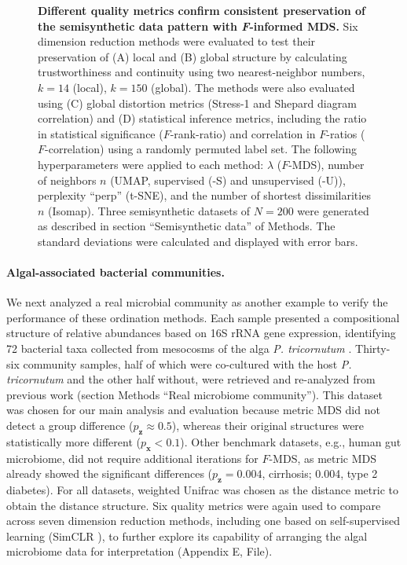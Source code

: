 \documentclass[10pt,letterpaper]{article}
\newcommand{\1}{{\rm 1}\kern-0.24em{\rm I}}
\begin{document}
\begin{figure}[h!]
    \centering
    \caption{\textbf{Different quality metrics confirm consistent preservation of the semisynthetic data pattern with \textit{F}-informed MDS.} Six dimension reduction methods were evaluated to test their preservation of (A) local and (B) global structure by calculating trustworthiness and continuity using two nearest-neighbor numbers, $k=14$ (local), $k=150$ (global). The methods were also evaluated using (C) global distortion metrics (Stress-1 and Shepard diagram correlation) and (D) statistical inference metrics, including the ratio in statistical significance ($F$-rank-ratio) and correlation in $F$-ratios ($F$-correlation) using a randomly permuted label set. The following hyperparameters were applied to each method: $\lambda$ ($F$-MDS), number of neighbors $n$ (UMAP, supervised (-S) and unsupervised (-U)), perplexity ``perp'' (t-SNE), and the number of shortest dissimilarities $n$ (Isomap). Three semisynthetic datasets of $N=200$ were generated as described in section ``Semisynthetic data'' of Methods. The standard deviations were calculated and displayed with error bars.}
    \label{fig:eval_simul}
\end{figure}


\paragraph*{Algal-associated bacterial communities.}
We next analyzed a real microbial community as another example to verify the performance of these ordination methods. Each sample presented a compositional structure of relative abundances based on 16S rRNA gene expression, identifying 72 bacterial taxa collected from mesocosms of the alga \textit{P. tricornutum} \cite{Samo18, Kimbrel19}. Thirty-six community samples, half of which were co-cultured with the host \textit{P. tricornutum} and the other half without, were retrieved and re-analyzed from previous work \cite{kim22} (section Methods ``Real microbiome community''). This dataset was chosen for our main analysis and evaluation because metric MDS did not detect a group difference ($p_\mathbf{z}\approx0.5$), whereas their original structures were statistically more different ($p_\mathbf{x}<0.1$). Other benchmark datasets, e.g., human gut microbiome, did not require additional iterations for $F$-MDS, as metric MDS already showed the significant differences ($p_\mathbf{z}= 0.004$, cirrhosis; 0.004, type 2 diabetes). For all datasets, weighted Unifrac \cite{lozupone07} was chosen as the distance metric to obtain the distance structure. Six quality metrics were again used to compare across seven dimension reduction methods, including one based on self-supervised learning (SimCLR \cite{chen20}), to further explore its capability of arranging the algal microbiome data for interpretation (Appendix E,  File). 
\end{document}
